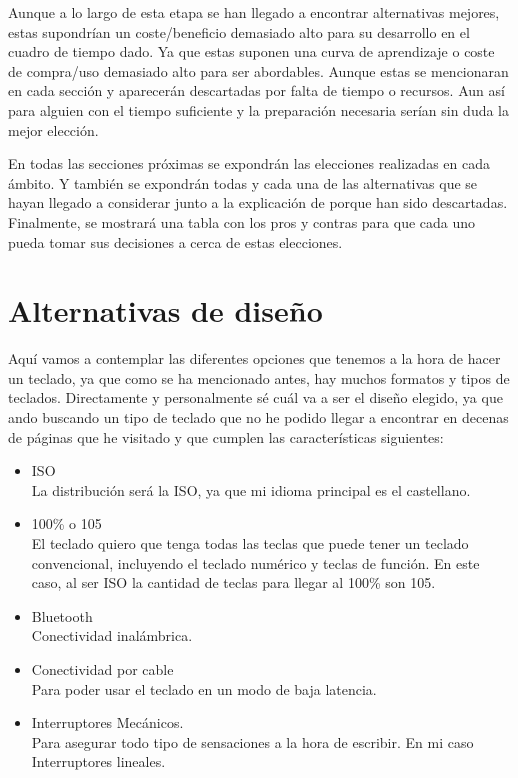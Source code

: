 Aunque a lo largo de esta etapa se han llegado a encontrar alternativas mejores, estas supondrían un coste/beneficio demasiado alto para su desarrollo en el cuadro de tiempo dado.
Ya que estas suponen una curva de aprendizaje o coste de compra/uso demasiado alto para ser abordables. Aunque estas se mencionaran en cada sección y aparecerán descartadas por falta de tiempo o recursos. Aun así para alguien con el tiempo suficiente y la preparación necesaria serían sin duda la mejor elección.

En todas las secciones próximas se expondrán las elecciones realizadas en cada ámbito. Y también se expondrán todas y cada una de las alternativas que se hayan llegado a considerar junto a la explicación de porque han sido descartadas. Finalmente, se mostrará una tabla con los pros y contras para que cada uno pueda tomar sus decisiones a cerca de estas elecciones.

\section{Alternativas de diseño}
Aquí vamos a contemplar las diferentes opciones que tenemos a la hora de hacer un teclado, ya que como se ha mencionado antes, hay muchos formatos y tipos de teclados. Directamente y personalmente sé cuál va a ser el diseño elegido, ya que ando buscando un tipo de teclado que no he podido llegar a encontrar en decenas de páginas  que he visitado y que cumplen las características siguientes:
\begin{itemize}
\item \gls{ISO} \\ La distribución será la \gls{ISO}, ya que mi idioma principal es el castellano.
\item 100\% o 105 \\ El teclado quiero que tenga todas las teclas que puede tener un teclado convencional, incluyendo el teclado numérico y teclas de función. En este caso, al ser \gls{ISO} la cantidad de teclas para llegar al 100\% son 105.
\item \gls{Bluetooth} \\ Conectividad inalámbrica.
\item Conectividad por cable \\ Para poder usar el teclado en un modo de baja latencia.
\item Interruptores Mecánicos. \\ Para asegurar todo tipo de sensaciones a la hora de escribir. En mi caso Interruptores lineales.
\end{itemize}

